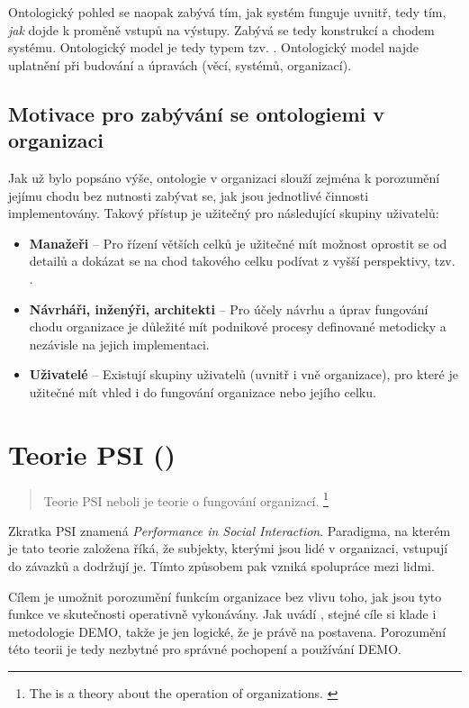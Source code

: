 Ontologický pohled se naopak zabývá tím, jak systém funguje uvnitř, tedy tím, \textit{jak} dojde k proměně vstupů na výstupy. Zabývá se tedy konstrukcí a chodem systému. Ontologický model je tedy typem tzv. . Ontologický model najde uplatnění při budování a úpravách (věcí, systémů, organizací).

\subsection{Motivace pro zabývání se ontologiemi v organizaci}
Jak už bylo popsáno výše, ontologie v organizaci slouží zejména k porozumění jejímu chodu bez nutnosti zabývat se, jak jsou jednotlivé činnosti implementovány. Takový přístup je užitečný pro následující skupiny uživatelů: \cite{Dietz2005}

\begin{itemize}
\item \textbf{Manažeři} – Pro řízení větších celků je užitečné mít možnost oprostit se od detailů a dokázat se na chod takového celku podívat z vyšší perspektivy, tzv. .
\item \textbf{Návrháři, inženýři, architekti} – Pro účely návrhu a úprav fungování chodu organizace je důležité mít podnikové procesy definované metodicky a nezávisle na jejich implementaci.
\item \textbf{Uživatelé} – Existují skupiny uživatelů (uvnitř i vně organizace), pro které je užitečné mít vhled i do fungování organizace nebo jejího celku.
\end{itemize}

\section{Teorie PSI (\ptheory)}

\begin{quote}
Teorie PSI neboli \ptheory{}  je teorie o fungování organizací. \cite{Dietz2005}
\footnote{The \ptheory{} is a theory about the operation of organizations. \cite{Dietz2005}}
\end{quote}

Zkratka PSI znamená \textit{Performance in Social Interaction}. Paradigma, na kterém je tato teorie založena říká, že subjekty, kterými jsou lidé v organizaci, vstupují do závazků a dodržují je. Tímto způsobem pak vzniká spolupráce mezi lidmi. 

Cílem \ptheory{} je umožnit porozumění funkcím
organizace bez vlivu toho, jak jsou tyto funkce ve skutečnosti operativně vykonávány. Jak uvádí \cite{Vejrazkova2013}, stejné cíle si klade i metodologie DEMO, takže je jen logické, že je právě na \ptheory{} postavena. Porozumění této teorii je tedy nezbytné pro správné pochopení a používání DEMO.

